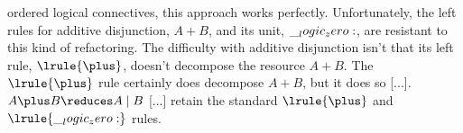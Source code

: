 


ordered logical connectives, this approach works perfectly.
Unfortunately, the left rules for additive disjunction, $A \plus B$, and its unit, $\__logic_zero:$, are resistant to this kind of refactoring.
The difficulty with additive disjunction isn't that its left rule, $\lrule{\plus}$,%
doesn't decompose the resource $A \plus B$.
The $\lrule{\plus}$ rule certainly does decompose $A \plus B$, but it does so [...].
$A \plus B \reduces A \mid B$
[...] retain the standard $\lrule{\plus}$ and $\lrule{\zero}$ rules.

